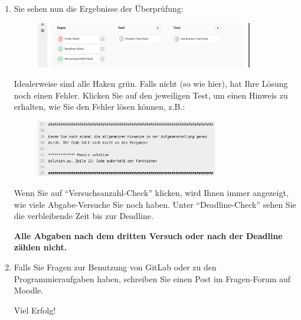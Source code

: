 \documentclass{scrartcl}
\begin{document}
\begin{enumerate}
		\vspace{3cm}
		
		\pagebreak
		
		\item Sie sehen nun die Ergebnisse der Überprüfung:
		
		\vfill
		
		\begin{figure}[h!]
			\centering
			\includegraphics[width=0.9\textwidth]{img/de/screenshot-pipeline-results.png}
		\end{figure}
		
		\vfill
		
		Idealerweise sind alle Haken grün. Falls nicht (so wie hier), hat Ihre Lösung noch einen Fehler. Klicken Sie auf den jeweiligen Test, um einen Hinweis zu erhalten, wie Sie den Fehler lösen können, z.B.:
		
		\vfill
		
		\begin{figure}[h!]
			\centering		
			\includegraphics[width=0.75\textwidth]{img/de/screenshot-hint.png}
		\end{figure}
		
		\vfill
		
		\begin{tcolorbox}[title=\faLightbulbO\space Hinweis,colbacktitle=hintboxcolor,colframe=hintboxcolor]
			Wenn Sie auf \enquote{Versuchsanzahl-Check} klicken, wird Ihnen immer angezeigt, wie viele Abgabe-Versuche Sie noch haben.
			Unter \enquote{Deadline-Check} sehen Sie die verbleibende Zeit bis zur Deadline.
			
			\bfseries Alle Abgaben nach dem dritten Versuch oder nach der Deadline zählen nicht.
		\end{tcolorbox}
	
		\vfill
		
		\item Falls Sie Fragen zur Benutzung von GitLab oder zu den Programmieraufgaben haben, schreiben Sie einen Post im Fragen-Forum auf Moodle.
		
		\vfill
		
		{\Huge Viel Erfolg!}
		
		\vspace{3cm}
	\end{enumerate}
\end{document}
